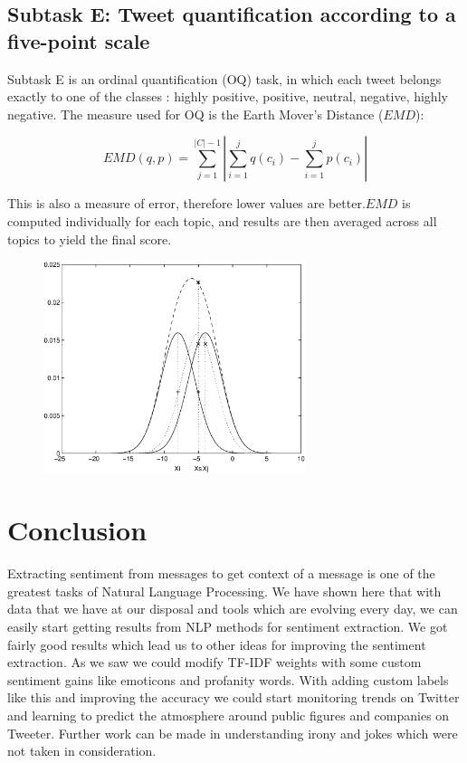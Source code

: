 \documentclass[runningheads,a4paper]{llncs}
\begin{document}
\subsection{Subtask E: Tweet quantification according to a five-point scale}

Subtask E is an ordinal quantification (OQ) task, in which each tweet belongs exactly to one of the classes : highly positive, positive, neutral, negative, highly negative. The measure used for OQ is the Earth Mover's Distance ($EMD$):  

\begin{equation}
EMD(q, p) = \sum_{j=1}^{|C| - 1}|\sum_{i=1}^jq(c_i) - \sum_{i=1}^jp(c_i)|
\end{equation}

This is also a measure of error, therefore lower values are better.$EMD$ is computed individually for each topic, and results are then averaged across all topics to yield the final score.
\begin{figure}
\centering
\includegraphics[height=6.2cm]{eijkel2}
\caption{}
\label{fig:example}
\end{figure}


\section{Conclusion}
Extracting sentiment from messages to get context of a message is one of the greatest tasks of Natural Language Processing. We have shown here that with data that we have at our disposal and tools which are evolving every day, we can easily start getting results from NLP methods for sentiment extraction. We got fairly good results which lead us to other ideas for improving the sentiment extraction. As we saw we could modify TF-IDF weights with some custom sentiment gains like emoticons and profanity words. With adding custom labels like this and improving the accuracy we could start monitoring trends on Twitter and learning to predict the atmosphere around public figures and companies on Tweeter. Further work can be made in understanding irony and jokes which were not taken in consideration.
\end{document}
